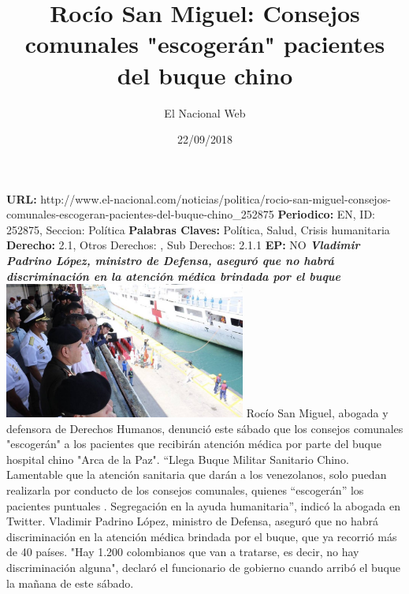 \documentclass{article}%
\title{\textbf{Rocío San Miguel: Consejos comunales "escogerán" pacientes del buque chino}}%
\author{El Nacional Web}%
\date{22/09/2018}%
\begin{document}
%
\normalsize%
\maketitle%
\textbf{URL: }%
http://www.el{-}nacional.com/noticias/politica/rocio{-}san{-}miguel{-}consejos{-}comunales{-}escogeran{-}pacientes{-}del{-}buque{-}chino\_252875\newline%
%
\textbf{Periodico: }%
EN, %
ID: %
252875, %
Seccion: %
Política\newline%
%
\textbf{Palabras Claves: }%
Política, Salud, Crisis humanitaria\newline%
%
\textbf{Derecho: }%
2.1, %
Otros Derechos: %
, %
Sub Derechos: %
2.1.1\newline%
%
\textbf{EP: }%
NO\newline%
\newline%
%
\textbf{\textit{Vladimir Padrino López, ministro de Defensa, aseguró que no habrá discriminación en la atención médica brindada por el buque}}%
\newline%
\newline%
%
\includegraphics[width=300px]{7.jpg}%
\newline%
%
Rocío San Miguel, abogada y defensora de Derechos Humanos, denunció este sábado que los consejos comunales "escogerán" a los pacientes que recibirán atención médica por parte del buque hospital chino "Arca de la Paz".%
\newline%
%
“Llega Buque Militar Sanitario Chino. Lamentable que la atención sanitaria que darán a los venezolanos, solo puedan realizarla por conducto de los consejos comunales, quienes “escogerán” los pacientes puntuales . Segregación en la ayuda humanitaria”, indicó la abogada en Twitter.%
\newline%
%
Vladimir Padrino López, ministro de Defensa, aseguró que no habrá discriminación en la atención médica brindada por el buque, que ya recorrió más de 40 países.%
\newline%
%
"Hay 1.200 colombianos que van a tratarse, es decir, no hay discriminación alguna", declaró el funcionario de gobierno cuando arribó el buque la mañana de este sábado.%
\newline%
%
\end{document}
